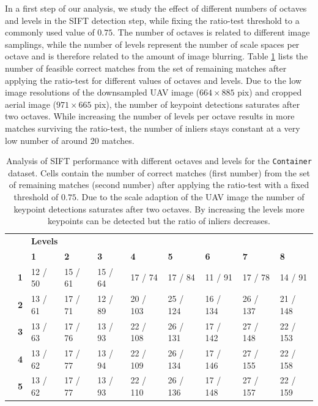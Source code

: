 In a first step of our analysis, we study the effect of different numbers of octaves and levels in the SIFT detection step, while fixing the ratio-test threshold to a commonly used value of $0.75$.
The number of octaves is related to different image samplings, while the number of levels represent the number of scale spaces per octave and is therefore related to the amount of image blurring.
Table \ref{tab:Octaves} lists the number of feasible correct matches from the set of remaining matches after applying the ratio-test for different values of octaves and levels. 
Due to the low image resolutions of the downsampled UAV image ($664 \times 885$ pix) and cropped aerial image ($971 \times 665$ pix), the number of keypoint detections saturates after two octaves. 
While increasing the number of levels per octave results in more matches surviving the ratio-test, the number of inliers stays constant at a very low number of around 20 matches.


\begin{table}[tbp]
\centering
\small 
\begin{tabular}{rlllllllll}
\toprule
\multicolumn{1}{r}{}    &   & \multicolumn{8}{l}{\textbf{Levels}}  \\
\multicolumn{1}{l}{}    &   & \textbf{1} & \textbf{2} &  \textbf{3} &  \textbf{4} & \textbf{5} &  \textbf{6} &  \textbf{7} &  \textbf{8} \\
\cmidrule(lr){3-10} 
\footnotesize
\multirow{5}{*}{\rotatebox[origin=c]{90}{\small \textbf{Octaves}}} & \small \textbf{1} & 12 / 50  & 15 / 61  & 15 / 64  & 17 / 74  & 17 / 84  & 11 / 91  & 17 / 78  & 14 / 91  \\
& \small \textbf{2} & 13 / 61  & 17 / 71  & 12 / 89  & 20 / 103  & 25 / 124 & 16 / 134  & 26 / 137 & 21 / 148  \\
& \small \textbf{3} & 13 / 63  & 17 / 76  & 13 / 93  & 22 / 108  & 26 / 131 & 17 / 142  & 27 / 148 & 22 / 153  \\
& \small \textbf{4} & 13 / 62  & 17 / 77  & 13 / 94  & 22 / 109  & 26 / 134 & 17 / 146  & 27 / 155 & 22 / 158  \\
& \small \textbf{5} & 13 / 62  & 17 / 77  & 13 / 93  & 22 / 110  & 26 / 136 & 17 / 148  & 27 / 157 & 22 / 159  \\
\bottomrule
\end{tabular}
\caption{Analysis of SIFT performance with different octaves and levels for the \texttt{Container} dataset. Cells contain the number of correct matches (first number) from the set of remaining matches (second number) after applying the ratio-test with a fixed threshold of $0.75$. Due to the scale adaption of the UAV image the number of keypoint detections saturates after two octaves. By increasing the levels more keypoints can be detected but the ratio of inliers decreases.}
\label{tab:Octaves}
\end{table}

